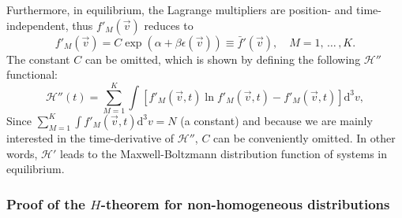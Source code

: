Furthermore, in equilibrium, the Lagrange multipliers are position- and time-independent,
thus $f'_M(\vec{v})$
reduces to
%
\begin{equation}\label{eq:fbardef}
    f'_M(\vec{v})=C\exp\left(\alpha+\beta \epsilon(\vec{v})\right)
    \equiv \bar{f}'(\vec{v}),\quad M=1,\,\dots\,,K.
\end{equation} 
%
The constant $C$ can be omitted, which is shown by defining the following $\mathcal{H}''$
functional:
%
\begin{equation}
   \mathcal{H}''(t)=\sum_{M=1}^{K}\int \left[f'_M(\vec{v},t)
    \ln f'_M(\vec{v},t)-f'_M(\vec{v},t)\right]\mathrm{d}^3v  \label{CH3},
\end{equation}
%
Since $\sum_{M=1}^{K} \int f'_M(\vec{v},t)\mathrm{d}^3v =N$ (a constant)
and because we are mainly interested in the time-derivative of $\mathcal{H}''$,
$C$ can be conveniently omitted. In other words, $\mathcal{H}'$ leads to the Maxwell-Boltzmann
distribution function of systems in equilibrium.

\subsubsection{Proof of the $H$-theorem for non-homogeneous distributions}

